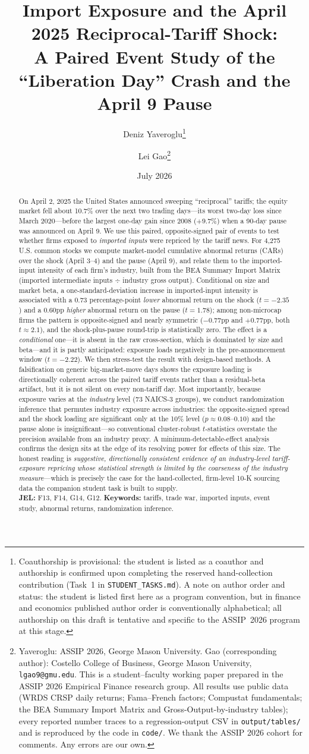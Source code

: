 \documentclass[12pt]{article}
\title{\textbf{Import Exposure and the April 2025 Reciprocal-Tariff Shock:\\
A Paired Event Study of the ``Liberation Day'' Crash and the April 9 Pause}}
\author{Deniz Yaveroglu\thanks{Coauthorship is provisional: the student is listed as a coauthor and authorship is confirmed upon completing the reserved hand-collection contribution (Task~1 in \texttt{STUDENT\_TASKS.md}). A note on author order and status: the student is listed first here as a program convention, but in finance and economics published author order is conventionally alphabetical; all authorship on this draft is tentative and specific to the ASSIP~2026 program at this stage.} \and Lei Gao\thanks{Yaveroglu: ASSIP 2026, George Mason
University. Gao (corresponding author): Costello College of Business, George Mason
University, \texttt{lgao9@gmu.edu}. This is a student--faculty working paper prepared in the
ASSIP 2026 Empirical Finance research group. All results use public data (WRDS CRSP daily
returns; Fama--French factors; Compustat fundamentals; the BEA Summary Import Matrix and
Gross-Output-by-industry tables); every reported number traces to a regression-output CSV in
\texttt{output/tables/} and is reproduced by the code in \texttt{code/}. We thank the ASSIP
2026 cohort for comments. Any errors are our own.}}
\date{July 2026}
\begin{document}
\maketitle

\begin{abstract}
\noindent On April 2, 2025 the United States announced sweeping ``reciprocal'' tariffs;
the equity market fell about 10.7\% over the next two trading days---its worst two-day
loss since March 2020---before the largest one-day gain since 2008 ($+9.7\%$) when a 90-day
pause was announced on April 9. We use this paired, opposite-signed pair of events to test
whether firms exposed to \emph{imported inputs} were repriced by the tariff news. For
4{,}275 U.S. common stocks we compute market-model cumulative abnormal returns (CARs) over
the shock (April 3--4) and the pause (April 9), and relate them to the imported-input
intensity of each firm's industry, built from the BEA Summary Import Matrix (imported
intermediate inputs $\div$ industry gross output). Conditional on size and market beta, a
one-standard-deviation increase in imported-input intensity is associated with a 0.73
percentage-point \emph{lower} abnormal return on the shock ($t=-2.35$) and a 0.60pp
\emph{higher} abnormal return on the pause ($t=1.78$); among non-microcap firms the pattern
is opposite-signed and nearly symmetric ($-0.77$pp and $+0.77$pp, both $t\approx2.1$), and
the shock-plus-pause round-trip is statistically zero. The effect is a \emph{conditional}
one---it is absent in the raw cross-section, which is dominated by size and beta---and it
is partly anticipated: exposure loads negatively in the pre-announcement window
($t=-2.22$). We then stress-test the result with design-based methods. A falsification on
generic big-market-move days shows the exposure loading is directionally coherent across the
paired tariff events rather than a residual-beta artifact, but it is not silent on every
non-tariff day. Most importantly, because exposure varies at the \emph{industry} level (73
NAICS-3 groups), we conduct randomization inference that permutes industry exposure across
industries: the opposite-signed spread and the shock loading are significant only at the
10\% level ($p\approx0.08$--$0.10$) and the pause alone is insignificant---so conventional
cluster-robust $t$-statistics overstate the precision available from an industry proxy. A
minimum-detectable-effect analysis confirms the design sits at the edge of its resolving
power for effects of this size. The honest reading is \emph{suggestive, directionally
consistent evidence of an industry-level tariff-exposure repricing whose statistical strength
is limited by the coarseness of the industry measure}---which is precisely the case for the
hand-collected, firm-level 10-K sourcing data the companion student task is built to supply.
\\[4pt]
\noindent\textbf{JEL:} F13, F14, G14, G12. \quad
\textbf{Keywords:} tariffs, trade war, imported inputs, event study, abnormal returns,
randomization inference.
\end{abstract}
\end{document}
